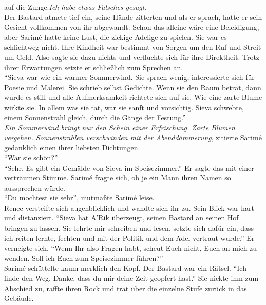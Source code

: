auf die Zunge.\textit{Ich habe etwas Falsches gesagt.}\\
Der Bastard atmete tief ein, seine Hände zitterten und als er sprach, hatte er sein Gesicht 
vollkommen von ihr abgewandt. Schon das alleine wäre eine Beleidigung, aber Sarimé hatte keine 
Lust, die zickige Adelige zu spielen. Sie war es schlichtweg nicht. Ihre Kindheit war bestimmt von 
Sorgen um den Ruf und Streit um Geld. Also sagte sie dazu nichts und verfluchte sich für ihre 
Direktheit. Trotz ihrer Erwartungen setzte er schließlich zum Sprechen an.\\
``Sieva war wie ein warmer Sommerwind. Sie sprach wenig, interessierte sich für Poesie und Malerei. 
Sie schrieb selbst Gedichte. Wenn sie den Raum betrat, dann wurde es still und alle Aufmerksamkeit 
richtete sich auf sie. Wie eine zarte Blume wirkte sie. In allem was sie tat, war sie sanft und 
vorsichtig. Sieva schwebte, einem Sonnenstrahl gleich, durch die Gänge der Festung.''\\
\textit{Ein Sommerwind bringt nur den Schein einer Erfrischung. Zarte Blumen vergehen. 
Sonnenstrahlen verschwinden mit der Abenddämmerung}, zitierte Sarimé gedanklich einen ihrer 
liebsten Dichtungen.\\
``War sie schön?''\\
``Sehr. Es gibt ein Gemälde von Sieva im Speisezimmer.'' Er sagte das mit einer verträumen Stimme. 
Sarimé fragte sich, ob je ein Mann ihren Namen so aussprechen würde. \\
``Du mochtest sie sehr'', mutmaßte Sarimé leise.\\
Renec versteifte sich augenblicklich und wandte sich ihr zu. Sein Blick war hart und distanziert. 
``Sieva hat A'Rik überzeugt, seinen Bastard an seinen Hof bringen zu lassen. Sie lehrte mir 
schreiben und lesen, setzte sich dafür ein, dass ich reiten lernte, fechten und mit der Politik und 
dem Adel vertraut wurde.'' Er verneigte sich. ``Wenn Ihr also Fragen habt, scheut Euch nicht, Euch 
an mich zu wenden. Soll ich Euch zum Speisezimmer führen?''\\
Sarimé schüttelte kaum merklich den Kopf. Der Bastard war ein Rätsel. ``Ich finde den Weg. Danke, 
dass du mir deine Zeit geopfert hast.'' Sie nickte ihm zum Abschied zu, raffte ihren Rock und trat 
über die einzelne Stufe zurück in das Gebäude.\\

